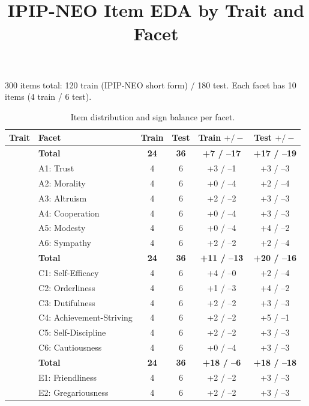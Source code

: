 \documentclass[11pt]{article}
\title{IPIP-NEO Item EDA by Trait and Facet}
\author{}
\date{}
\begin{document}
\maketitle

300 items total: 120 train (IPIP-NEO short form) / 180 test. Each facet has 10 items (4 train / 6 test).

\begin{table}[h]
\centering
\caption{Item distribution and sign balance per facet.}
\begin{tabular}{llcccc}
\toprule
Trait & Facet & Train & Test & Train $+/-$ & Test $+/-$ \\
\midrule
\rowcolor{lightgray}
\multirow{7}{*}{\textbf{Agreeableness (A)}} & \textbf{Total} & \textbf{24} & \textbf{36} & \textbf{+7 / --17} & \textbf{+17 / --19} \\
 & A1: Trust            & 4 & 6 & +3 / --1 & +3 / --3 \\
 & A2: Morality         & 4 & 6 & +0 / --4 & +2 / --4 \\
 & A3: Altruism         & 4 & 6 & +2 / --2 & +3 / --3 \\
 & A4: Cooperation      & 4 & 6 & +0 / --4 & +3 / --3 \\
 & A5: Modesty          & 4 & 6 & +0 / --4 & +4 / --2 \\
 & A6: Sympathy         & 4 & 6 & +2 / --2 & +2 / --4 \\
\midrule
\rowcolor{lightgray}
\multirow{7}{*}{\textbf{Conscientiousness (C)}} & \textbf{Total} & \textbf{24} & \textbf{36} & \textbf{+11 / --13} & \textbf{+20 / --16} \\
 & C1: Self-Efficacy         & 4 & 6 & +4 / --0 & +2 / --4 \\
 & C2: Orderliness           & 4 & 6 & +1 / --3 & +4 / --2 \\
 & C3: Dutifulness           & 4 & 6 & +2 / --2 & +3 / --3 \\
 & C4: Achievement-Striving  & 4 & 6 & +2 / --2 & +5 / --1 \\
 & C5: Self-Discipline       & 4 & 6 & +2 / --2 & +3 / --3 \\
 & C6: Cautiousness          & 4 & 6 & +0 / --4 & +3 / --3 \\
\midrule
\rowcolor{lightgray}
\multirow{7}{*}{\textbf{Extraversion (E)}} & \textbf{Total} & \textbf{24} & \textbf{36} & \textbf{+18 / --6} & \textbf{+18 / --18} \\
 & E1: Friendliness       & 4 & 6 & +2 / --2 & +3 / --3 \\
 & E2: Gregariousness     & 4 & 6 & +2 / --2 & +3 / --3 \\

\end{tabular}
\end{table}
\end{document}
